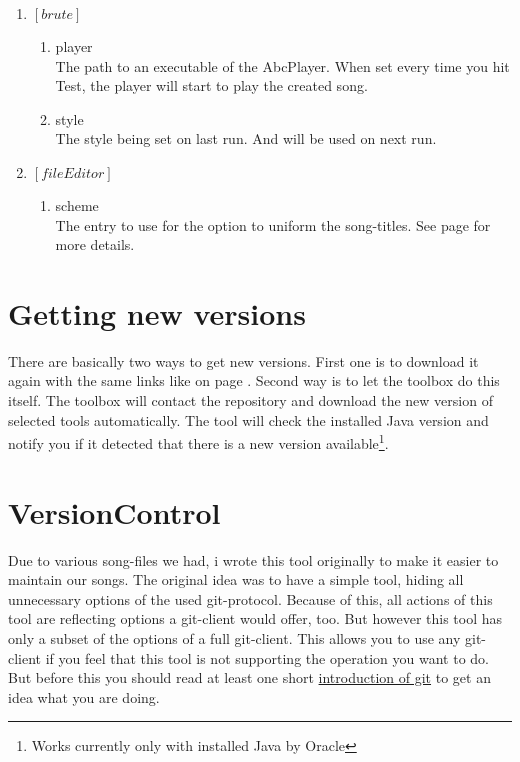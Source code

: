 \documentclass[10pt,a4paper,oneside]{article}
\begin{document}
\begin{enumerate}
\item[] $\left[brute\right]$
\begin{enumerate}
\item[] player \\ The path to an executable of the AbcPlayer. When set every time you hit Test, the player will start to play the created song.
\item[] style \\ The style being set on last run. And will be used on next run.
\end{enumerate}

\item[] $\left[fileEditor\right]$
\begin{enumerate}
\item[] scheme \\ The entry to use for the option to uniform the song-titles. See page \pageref{name-scheme} for more details.
\end{enumerate}
\end{enumerate}

\newpage
\section{Getting new versions}
There are basically two ways to get new versions. First one is to download it again with the same links like on page \pageref{Preq}. Second way is to let the toolbox do this itself. The toolbox will contact the repository and download the new version of selected tools automatically. The tool will check the installed Java version and notify you if it detected that there is a new version available\footnote{Works currently only with installed Java by Oracle}. 

\newpage
\section{VersionControl}
Due to various song-files we had, i wrote this tool originally to make it easier to maintain our songs. The original idea was to have a simple tool, hiding all unnecessary options of the used git-protocol. Because of this, all actions of this tool are reflecting options a git-client would offer, too. But however this tool has only a subset of the options of a full git-client. This allows you  to use any git-client if you feel that this tool is not supporting the operation you want to do. But before this you should read at least one short \href{http://git-scm.com/docs}{introduction of git} to get an idea what you are doing.
\end{document}
